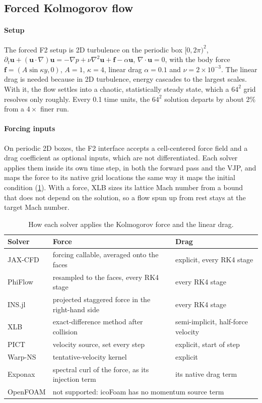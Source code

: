 \subsection{Forced Kolmogorov flow}
\label{app:kolmogorov}

\paragraph{Setup}
The forced F2 setup is 2D turbulence on the periodic box $[0,2\pi)^2$,
$\partial_t\mathbf{u} + (\mathbf{u}\cdot\nabla)\mathbf{u} = -\nabla p
+ \nu\nabla^2\mathbf{u} + \mathbf{f} - \alpha\mathbf{u}$,
$\nabla\cdot\mathbf{u} = 0$, with the body force
$\mathbf{f} = (A\sin\kappa y, 0)$, $A = 1$, $\kappa = 4$, linear drag
$\alpha = 0.1$ and $\nu = 2\times10^{-3}$.
The linear drag is needed because in 2D turbulence, energy cascades to the
largest scales. With it, the flow settles into a chaotic, statistically steady
state, which a $64^2$ grid resolves only roughly. Every 0.1 time units, the
$64^2$ solution departs by about 2\% from a $4\times$ finer run.

\paragraph{Forcing inputs}
On periodic 2D boxes, the F2 interface accepts a cell-centered force field and a
drag coefficient as optional inputs, which are not differentiated. Each solver
applies them inside its own time step, in both the forward pass and the VJP, and
maps the force to its native grid locations the same way it maps the initial
condition (\cref{tab:app:forcing}). With a force, XLB sizes its lattice Mach
number from a bound that does not depend on the solution, so a flow spun up from
rest stays at the target Mach number.

\begin{table}[h]
  \centering\small
  \caption{How each solver applies the Kolmogorov force and the linear drag.}
  \label{tab:app:forcing}
  \begin{tabular}{@{}lll@{}}
    \toprule
    \textbf{Solver} & \textbf{Force} & \textbf{Drag} \\
    \midrule
    JAX-CFD & forcing callable, averaged onto the faces & explicit, every RK4 stage \\
    PhiFlow & resampled to the faces, every RK4 stage & every RK4 stage \\
    INS.jl & projected staggered force in the right-hand side & every RK4 stage \\
    XLB & exact-difference method after collision & semi-implicit, half-force velocity \\
    PICT & velocity source, set every step & explicit, start of step \\
    Warp-NS & tentative-velocity kernel & explicit \\
    Exponax & spectral curl of the force, as its injection term & its native drag term \\
    OpenFOAM & \multicolumn{2}{l}{not supported: icoFoam has no momentum source term} \\
    \bottomrule
  \end{tabular}
\end{table}

